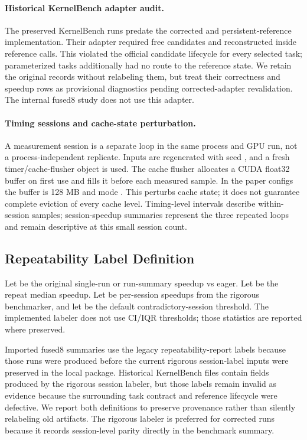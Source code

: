 \paragraph{Historical KernelBench adapter audit.}
The preserved KernelBench runs predate the corrected  and persistent-reference implementation. Their adapter required free  candidates and reconstructed  inside reference calls. This violated the official candidate lifecycle for every selected task; parameterized tasks additionally had no route to the reference state. We retain the original records without relabeling them, but treat their correctness and speedup rows as provisional diagnostics pending corrected-adapter revalidation. The internal fused8 study does not use this adapter.



\paragraph{Timing sessions and cache-state perturbation.}
A measurement session is a separate loop in the same process and GPU run, not a process-independent replicate. Inputs are regenerated with seed , and a fresh timer/cache-flusher object is used. The cache flusher allocates a CUDA float32 buffer on first use and fills it before each measured sample. In the paper configs the buffer is 128 MB and mode . This perturbs cache state; it does not guarantee complete eviction of every cache level. Timing-level intervals describe within-session samples; session-speedup summaries represent the three repeated loops and remain descriptive at this small session count.

\subsection{Repeatability Label Definition}

Let  be the original single-run or run-summary speedup vs eager. Let  be the repeat median speedup. Let  be per-session speedups from the rigorous benchmarker, and let  be the default contradictory-session threshold. The implemented labeler does not use CI/IQR thresholds; those statistics are reported where preserved.

Imported fused8 summaries use the legacy repeatability-report labels because those runs were produced before the current rigorous session-label inputs were preserved in the local package. Historical KernelBench files contain fields produced by the rigorous session labeler, but those labels remain invalid as evidence because the surrounding task contract and reference lifecycle were defective. We report both definitions to preserve provenance rather than silently relabeling old artifacts. The rigorous labeler is preferred for corrected runs because it records session-level parity directly in the benchmark summary.

